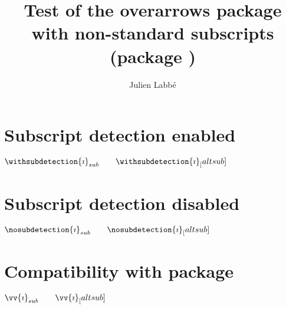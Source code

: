 \documentclass{article}
\title{Test of the \textsf{overarrows} package\\with non-standard subscripts (package \pkg{altsubsup})}
\author{Julien Labb\'e}
\begin{document}
\maketitle


\section{Subscript detection enabled}

\begin{dispExample}
\TestOverArrow*{\withsubdetection}

$ \withsubdetection{\imath}_{sub} \qquad \withsubdetection{\imath}_[altsub]$
\end{dispExample}

\section{Subscript detection disabled}

\begin{dispExample}
\TestOverArrow*{\nosubdetection}

$ \nosubdetection{\imath}_{sub} \qquad \nosubdetection{\imath}_[altsub]$
\end{dispExample}

\section{Compatibility with  package}

\begin{dispExample}
  $ \vv{\imath}_{sub} \qquad \vv{\imath}_[altsub]$
\end{dispExample}
\end{document}
